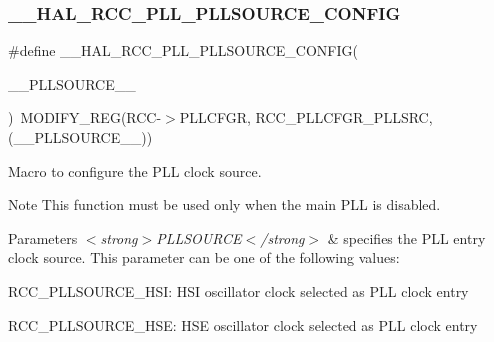 \subsubsection{\texorpdfstring{\+\_\+\+\_\+\+H\+A\+L\+\_\+\+R\+C\+C\+\_\+\+P\+L\+L\+\_\+\+P\+L\+L\+S\+O\+U\+R\+C\+E\+\_\+\+C\+O\+N\+F\+IG}{\_\_HAL\_RCC\_PLL\_PLLSOURCE\_CONFIG}}
{\footnotesize\ttfamily \#define \+\_\+\+\_\+\+H\+A\+L\+\_\+\+R\+C\+C\+\_\+\+P\+L\+L\+\_\+\+P\+L\+L\+S\+O\+U\+R\+C\+E\+\_\+\+C\+O\+N\+F\+IG(\begin{DoxyParamCaption}\item[{}]{\+\_\+\+\_\+\+P\+L\+L\+S\+O\+U\+R\+C\+E\+\_\+\+\_\+ }\end{DoxyParamCaption})~M\+O\+D\+I\+F\+Y\+\_\+\+R\+EG(R\+CC-\/$>$P\+L\+L\+C\+F\+GR, R\+C\+C\+\_\+\+P\+L\+L\+C\+F\+G\+R\+\_\+\+P\+L\+L\+S\+RC, (\+\_\+\+\_\+\+P\+L\+L\+S\+O\+U\+R\+C\+E\+\_\+\+\_\+))}



Macro to configure the P\+LL clock source. 

\begin{DoxyNote}{Note}
This function must be used only when the main P\+LL is disabled. 
\end{DoxyNote}

\begin{DoxyParams}{Parameters}
{\em $<$strong$>$\+P\+L\+L\+S\+O\+U\+R\+C\+E$<$/strong$>$} & specifies the P\+LL entry clock source. This parameter can be one of the following values\+: \begin{DoxyItemize}
\item R\+C\+C\+\_\+\+P\+L\+L\+S\+O\+U\+R\+C\+E\+\_\+\+H\+SI\+: H\+SI oscillator clock selected as P\+LL clock entry \item R\+C\+C\+\_\+\+P\+L\+L\+S\+O\+U\+R\+C\+E\+\_\+\+H\+SE\+: H\+SE oscillator clock selected as P\+LL clock entry \end{DoxyItemize}
\\
\hline
\end{DoxyParams}
